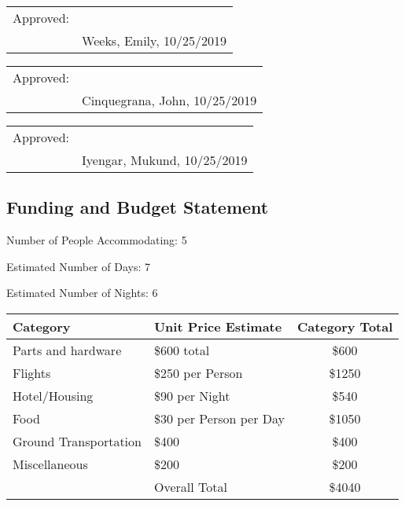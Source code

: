 \documentclass{article}
\let\Oldsubsection\subsection
\renewcommand{\subsection}{\FloatBarrier\Oldsubsection}
\begin{document}
\bigskip
\bigskip

\begin{tabular}{@{}p{.5in}p{3.5in}@{}}
Approved: & \hrulefill \\
& Weeks, Emily, 10/25/2019\\
\end{tabular}

\bigskip
\bigskip

\begin{tabular}{@{}p{.5in}p{3.5in}@{}}
Approved: & \hrulefill \\
& Cinquegrana, John, 10/25/2019\\
\end{tabular}

\bigskip
\bigskip

\begin{tabular}{@{}p{.5in}p{3.5in}@{}}
Approved: & \hrulefill \\
& Iyengar, Mukund, 10/25/2019\\
\end{tabular}

\newpage

\subsection{Funding and Budget Statement}

\bigskip

\hspace{1.275cm} Number of People Accommodating: 5

\bigskip

Estimated Number of Days: 7

\bigskip

Estimated Number of Nights: 6

\bigskip
\bigskip

\begin{tabular}{||l l c||} 
  \hline
  Category & Unit Price Estimate & Category Total \\ [0.5ex]
  \hline\hline
  Parts and hardware & \$600 total & \$600 \\ 
  \hline
  Flights & \$250 per Person & \$1250 \\ 
  \hline
  Hotel/Housing & \$90 per Night & \$540 \\
  \hline
  Food & \$30 per Person per Day & \$1050 \\
  \hline
  Ground Transportation & \$400 & \$400 \\
  \hline
  Miscellaneous & \$200 & \$200 \\
  \hline
   & Overall Total & \$4040 \\
  \hline
 \end{tabular}
 
\end{document}
